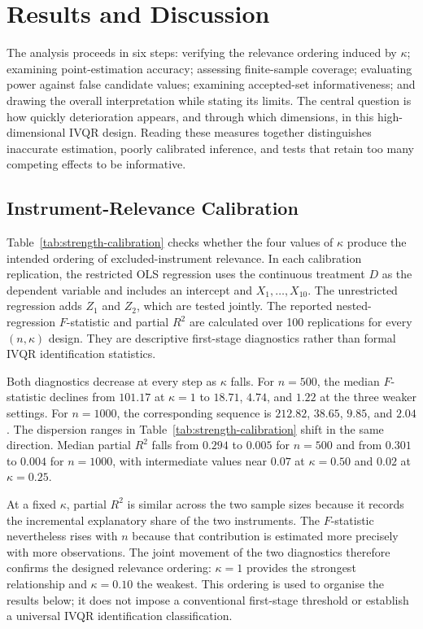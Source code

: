 \section{Results and Discussion}
\label{chap:results}
The analysis proceeds in six steps: verifying the relevance ordering induced by $\kappa$; examining point-estimation accuracy; assessing finite-sample coverage; evaluating power against false candidate values; examining accepted-set informativeness; and drawing the overall interpretation while stating its limits. The central question is how quickly deterioration appears, and through which dimensions, in this high-dimensional IVQR design. Reading these measures together distinguishes inaccurate estimation, poorly calibrated inference, and tests that retain too many competing effects to be informative.
\suppressfloats[t]

\subsection{Instrument-Relevance Calibration}
\label{sec:results-relevance-calibration}

Table~\ref{tab:strength-calibration} checks whether the four values of $\kappa$ produce the intended ordering of excluded-instrument relevance. In each calibration replication, the restricted OLS regression uses the continuous treatment $D$ as the dependent variable and includes an intercept and $X_1,\ldots,X_{10}$. The unrestricted regression adds $Z_1$ and $Z_2$, which are tested jointly. The reported nested-regression $F$-statistic and partial $R^2$ are calculated over 100 replications for every $(n,\kappa)$ design. They are descriptive first-stage diagnostics rather than formal IVQR identification statistics.



Both diagnostics decrease at every step as $\kappa$ falls. For $n=500$, the median $F$-statistic declines from $101.17$ at $\kappa=1$ to $18.71$, $4.74$, and $1.22$ at the three weaker settings. For $n=1000$, the corresponding sequence is $212.82$, $38.65$, $9.85$, and $2.04$. The dispersion ranges in Table~\ref{tab:strength-calibration} shift in the same direction. Median partial $R^2$ falls from $0.294$ to $0.005$ for $n=500$ and from $0.301$ to $0.004$ for $n=1000$, with intermediate values near $0.07$ at $\kappa=0.50$ and $0.02$ at $\kappa=0.25$.

At a fixed $\kappa$, partial $R^2$ is similar across the two sample sizes because it records the incremental explanatory share of the two instruments. The $F$-statistic nevertheless rises with $n$ because that contribution is estimated more precisely with more observations. The joint movement of the two diagnostics therefore confirms the designed relevance ordering: $\kappa=1$ provides the strongest relationship and $\kappa=0.10$ the weakest. This ordering is used to organise the results below; it does not impose a conventional first-stage threshold or establish a universal IVQR identification classification.

